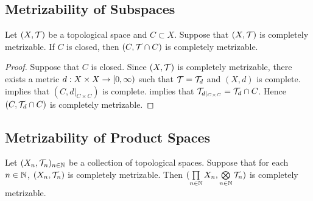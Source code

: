 \documentclass{book}
\begin{document}
\subsection{Metrizability of Subspaces}

\begin{ex} 
	Let $(X, \mathcal{T})$ be a topological space and $C \subset X$. Suppose that $(X, \mathcal{T})$ is completely metrizable. If $C$ is closed, then $(C, \mathcal{T} \cap C)$ is completely metrizable. 
\end{ex}

\begin{proof}
	Suppose that $C$ is closed. Since $(X, \mathcal{T})$ is completely metrizable, there exists a metric $d: X \times X \rightarrow	[0,\infty)$ such that $\mathcal{T} = \mathcal{T}_d$ and $(X, d)$ is complete.  implies that $(C, d|_{C \times C})$ is complete.  implies that $\mathcal{T}_{d|_{C \times C}} = \mathcal{T}_d \cap C$. Hence $(C, \mathcal{T}_d \cap C)$ is completely metrizable. 
\end{proof}


























\subsection{Metrizability of Product Spaces}

\begin{ex}
	
\end{ex}

\begin{ex} 
	Let $(X_n, \mathcal{T}_n)_{n \in \mathbb{N}}$ be a collection of topological spaces. Suppose that for each $n \in \mathbb{N}$, $(X_n, \mathcal{T}_n)$ is completely metrizable. Then $(\prod\limits_{n \in \mathbb{N}} X_n, \bigotimes\limits_{n \in \mathbb{N}} \mathcal{T}_n)$ is completely metrizable.  
\end{ex}
\end{document}
